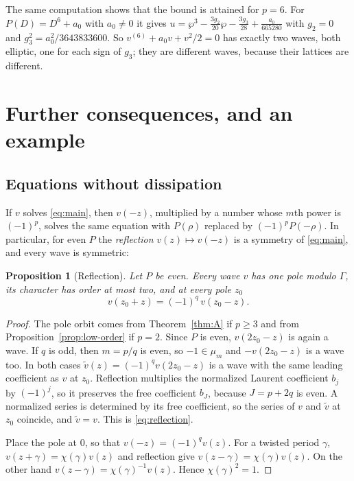\documentclass[11pt]{article}
\newtheorem{proposition}[theorem]{Proposition}
\theoremstyle{definition}
\theoremstyle{remark}
\numberwithin{equation}{section}
\begin{document}
The same computation shows that the bound is attained for \(p=6\). For
\(P(D)=D^6+a_0\) with \(a_0\ne0\) it gives
\(u=\wp^3-\tfrac{3g_2}{20}\wp-\tfrac{3g_3}{28}+\tfrac{a_0}{665280}\)
with \(g_2=0\) and \(g_3^2=a_0^2/3643833600\). So
\(v^{(6)}+a_0v+v^2/2=0\) has exactly two waves, both elliptic, one for
each sign of \(g_3\); they are different waves, because their lattices
are different.
\section{Further consequences, and an example}\label{sec:consequences}\label{sec:examples}

\subsection{Equations without dissipation}\label{sec:even}

If \(v\) solves \eqref{eq:main}, then \(v(-z)\), multiplied by a number
whose \(m\)th power is \((-1)^p\), solves the same equation with
\(P(\rho)\) replaced by \((-1)^pP(-\rho)\). In particular, for even
\(P\) the \emph{reflection} \(v(z)\mapsto v(-z)\) is a symmetry of
\eqref{eq:main}, and every wave is symmetric:

\begin{proposition}[Reflection]\label{prop:reflection}
Let \(P\) be even. Every wave \(v\) has one pole modulo \(\Gamma\), its
character has order at most two, and at every pole \(z_0\)
\begin{equation}\label{eq:reflection}
 v(z_0+z)=(-1)^q\,v(z_0-z).
\end{equation}
\end{proposition}

\begin{proof}
The pole orbit comes from Theorem~\ref{thm:A} if \(p\ge3\) and from
Proposition~\ref{prop:low-order} if \(p=2\). Since \(P\) is even,
\(v(2z_0-z)\) is again a wave. If \(q\) is odd, then \(m=p/q\) is even,
so \(-1\in\mu_m\) and \(-v(2z_0-z)\) is a wave too. In both cases
\(\tilde v(z)=(-1)^qv(2z_0-z)\) is a wave with the same leading
coefficient as \(v\) at \(z_0\). Reflection multiplies the normalized
Laurent coefficient \(b_j\) by \((-1)^j\), so it preserves the free
coefficient \(b_J\), because \(J=p+2q\) is even. A normalized series is
determined by its free coefficient, so the series of \(v\) and
\(\tilde v\) at \(z_0\) coincide, and \(\tilde v=v\). This is
\eqref{eq:reflection}.

Place the pole at \(0\), so that \(v(-z)=(-1)^qv(z)\). For a twisted
period \(\gamma\), \(v(z+\gamma)=\chi(\gamma)v(z)\) and reflection give
\(v(z-\gamma)=\chi(\gamma)v(z)\). On the other hand
\(v(z-\gamma)=\chi(\gamma)^{-1}v(z)\). Hence \(\chi(\gamma)^2=1\).
\end{proof}
\end{document}
